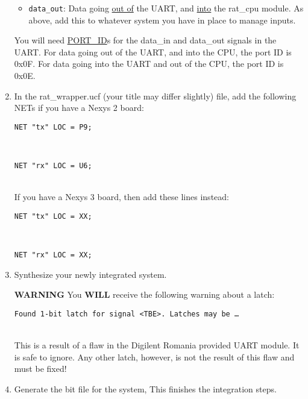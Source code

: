 \documentclass[notitlepage]{article}
\newcommand{\warningsign}{\fontencoding{U}\fontfamily{futs}\selectfont\char 66\relax}
\begin{document}
\begin{enumerate}
\begin{itemize}
\item \texttt{data\_out}: Data going \underline{out of} the UART, and \underline{into} the rat\_cpu module. As above, add this to whatever system you have in place to manage inputs.
\end{itemize}
You will need \underline{PORT\_ID}s for the data\_in and data\_out signals in the UART. For data going out of the UART, and into the CPU, the port ID is 0x0F. For data going into the UART and out of the CPU, the port ID is 0x0E.
\item In the rat\_wrapper.ucf (your title may differ slightly) file, add the following NETs if you have a Nexys 2 board:\\
\centerline{\texttt{NET "tx" LOC = P9;}}\\
\centerline{\texttt{NET "rx" LOC = U6;}}\\
If you have a Nexys 3 board, then add these lines instead:\\
\centerline{\texttt{NET "tx" LOC = XX;}}\\
\centerline{\texttt{NET "rx" LOC = XX;}}

\item Synthesize your newly integrated system.
\begin{infobox}
\textbf{{\warningsign} WARNING} You \textbf{WILL} receive the following warning about a latch:\\
\centerline{\texttt{Found 1-bit latch for signal \textless TBE\textgreater. Latches may be \ldots}}\\
This is a result of a flaw in the Digilent Romania provided UART module. It is safe to ignore. Any other latch, however, is not the result of this flaw and must be fixed!
\end{infobox}

\item Generate the bit file for the system, This finishes the integration steps.
\end{enumerate}
\end{document}
